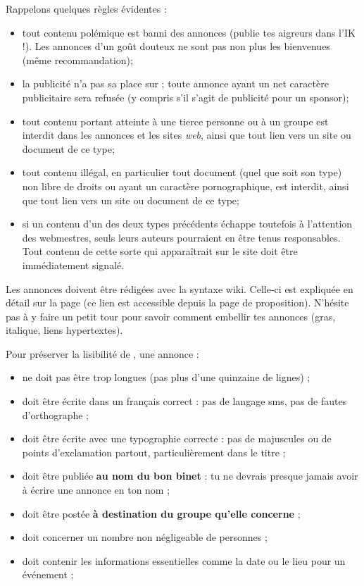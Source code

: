 Rappelons quelques règles évidentes :
\begin{itemize}
 \item tout contenu polémique est banni des annonces (publie tes aigreurs dans l'IK !).
       Les annonces d'un goût douteux ne sont pas non plus les bienvenues (même recommandation);
 \item la publicité n'a pas sa place sur \fkz ; toute annonce ayant un net caractère publicitaire
       sera refusée (y compris s'il s'agit de publicité pour un sponsor);
 \item tout contenu portant atteinte à  une tierce personne ou à  un groupe est interdit dans les annonces
       et les sites \emph{web}, ainsi que tout lien vers un site ou document de ce type;
 \item tout contenu illégal, en particulier tout document (quel que soit son type)
       non libre de droits ou ayant un caractère pornographique, est interdit,
       ainsi que tout lien vers un site ou document de ce type;
 \item si un contenu d'un des deux types précédents échappe toutefois à  l'attention des webmestres,
       seuls leurs auteurs pourraient en être tenus responsables.
       Tout contenu de cette sorte qui apparaîtrait sur le site doit être immédiatement signalé.
\end{itemize}

Les annonces doivent être rédigées avec la syntaxe wiki. Celle-ci est expliquée en détail sur la page  (ce lien est accessible depuis la page de proposition). N'hésite pas à  y faire un petit tour pour savoir comment embellir tes annonces (gras, italique, liens hypertextes).

Pour préserver la lisibilité de \fkz, une annonce :
\begin{itemize}
 \item ne doit pas être trop longues (pas plus d'une quinzaine de lignes) ;
 \item doit être écrite dans un français correct : pas de langage sms, pas de fautes d'orthographe ;
 \item doit être écrite avec une typographie correcte : pas de majuscules ou de points d'exclamation partout, particulièrement dans le titre ;
 \item doit être publiée \textbf{au nom du bon binet} : tu ne devrais presque jamais avoir à écrire une annonce en ton nom ;
 \item doit être postée \textbf{à destination du groupe qu'elle concerne} ;
 \item doit concerner un nombre non négligeable de personnes ;
 \item doit contenir les informations essentielles comme la date ou le lieu pour un événement ;
\end{itemize}


